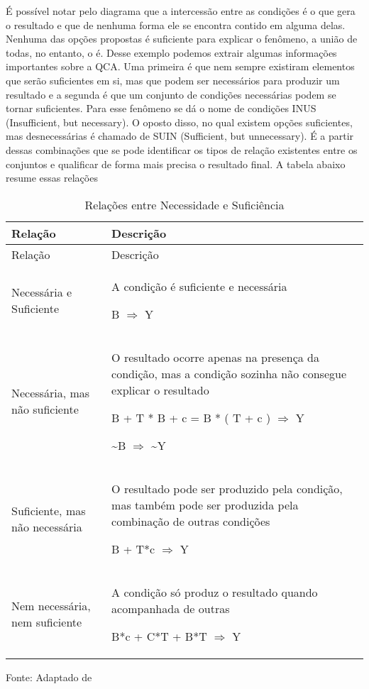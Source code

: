 \documentclass[
	12pt,				%
	oneside,			%
	a4paper,			%
	sumario=tradicional,
	english,			%
	brazil				%
	]{abntex2}
\newcommand{\bcenter}{\begin{center}}
\newcommand{\ecenter}{\end{center}}
\begin{document}
É possível notar pelo diagrama que a intercessão entre as condições é o que gera o resultado e que de nenhuma forma ele se encontra contido em alguma delas. Nenhuma das opções propostas é suficiente para explicar o fenômeno, a união de todas, no entanto, o é. Desse exemplo podemos extrair algumas informações importantes sobre a QCA. Uma primeira é que nem sempre existiram elementos que serão suficientes em si, mas que podem ser necessários para produzir um resultado e a segunda é que um conjunto de condições necessárias podem se tornar suficientes. Para esse fenômeno se dá o nome de condições \acrshort{INUS} (Insufficient, but necessary). O oposto disso, no qual existem opções suficientes, mas desnecessárias é chamado de \acrshort{SUIN} (Sufficient, but unnecessary). É a partir dessas combinações que se pode identificar os tipos de relação existentes entre os conjuntos e qualificar de forma mais precisa o resultado final. A tabela abaixo resume essas relações
\begin{longtable}[]{@{}
  >{\raggedright\arraybackslash}p{}
  >{\raggedright\arraybackslash}p{}@{}}
\caption{\label{tab:suin-inus} Relações entre Necessidade e Suficiência}\tabularnewline
\toprule
Relação & Descrição \\
\midrule
\endfirsthead
\toprule
Relação & Descrição \\
\midrule
\endhead
Necessária e Suficiente & A condição é suficiente e necessária

B \(\Rightarrow\) Y \\
Necessária, mas não suficiente & O resultado ocorre apenas na presença da condição, mas a condição sozinha não consegue explicar o resultado

B + T * B + c = B * ( T + c ) \(\Rightarrow\) Y

\textasciitilde B \(\Rightarrow\) \textasciitilde Y \\
Suficiente, mas não necessária & O resultado pode ser produzido pela condição, mas também pode ser produzida pela combinação de outras condições

B + T*c \(\Rightarrow\) Y \\
Nem necessária, nem suficiente & A condição só produz o resultado quando acompanhada de outras

B*c + C*T + B*T \(\Rightarrow\) Y \\
\bottomrule
\end{longtable}
\bcenter

Fonte: Adaptado de \autocite{betarelli_junior_introducao_2018}
\ecenter
\end{document}
